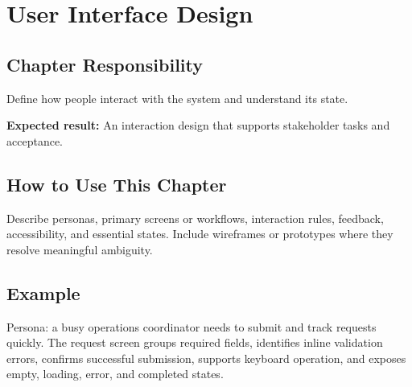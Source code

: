 \chapter{User Interface Design}
\section{Chapter Responsibility}
\label{Section:UserInterfaceDesignResponsibility}
Define how people interact with the system and understand its state.

\noindent\textbf{Expected result:} An interaction design that supports stakeholder tasks and acceptance.

\section{How to Use This Chapter}
Describe personas, primary screens or workflows, interaction rules, feedback, accessibility, and essential states. Include wireframes or prototypes where they resolve meaningful ambiguity.
\section{Example}
Persona: a busy operations coordinator needs to submit and track requests quickly. The request screen groups required fields, identifies inline validation errors, confirms successful submission, supports keyboard operation, and exposes empty, loading, error, and completed states.
